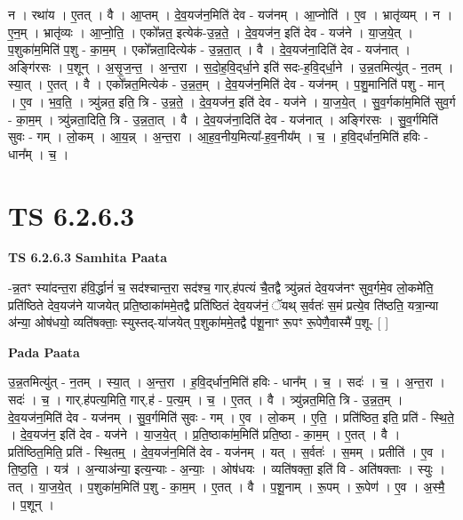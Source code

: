 \documentclass[17pt]{extarticle}
\begin{document}
न । रथा॑य । ए॒तत् । वै । आ॒प्तम् । दे॒व॒यज॑न॒मिति॑ देव - यज॑नम् । आ॒प्नोति॑ । ए॒व । भ्रातृ॑व्यम् । न । ए॒न॒म् । भ्रातृ॑व्यः । आ॒प्नो॒ति॒ । एको᳚न्नत॒ इत्येक॑-उ॒न्न॒ते॒ । दे॒व॒यज॑न॒ इति॑ देव - यज॑ने । या॒ज॒ये॒त् । प॒शुका॑म॒मिति॑ प॒शु - का॒म॒म् । एको᳚न्नता॒दित्येक॑ - उ॒न्न॒ता॒त् । वै । दे॒व॒यज॑ना॒दिति॑ देव - यज॑नात् । अङ्गि॑रसः । प॒शून् । अ॒सृ॒ज॒न्त॒ । अ॒न्त॒रा । स॒दो॒ह॒वि॒द्‌र्धा॒ने इति॑ सदः-ह॒वि॒द्‌र्धा॒ने । उ॒न्न॒तमित्यु॑त् - न॒तम् । स्या॒त् । ए॒तत् । वै । एको᳚न्नत॒मित्येक॑ - उ॒न्न॒त॒म् । दे॒व॒यज॑न॒मिति॑ देव - यज॑नम् । प॒शु॒मानिति॑ पशु - मान् । ए॒व । भ॒व॒ति॒ । त्र्यु॑न्नत॒ इति॒ त्रि - उ॒न्न॒ते॒ । दे॒व॒यज॑न॒ इति॑ देव - यज॑ने । या॒ज॒ये॒त् । सु॒व॒र्गका॑म॒मिति॑ सुव॒र्ग - का॒म॒म् । त्र्यु॑न्नता॒दिति॒ त्रि - उ॒न्न॒ता॒त् । वै । दे॒व॒यज॑ना॒दिति॑ देव - यज॑नात् । अङ्गि॑रसः । सु॒व॒र्गमिति॑ सुवः - गम् । लो॒कम् । आ॒य॒न्न् । अ॒न्त॒रा । आ॒ह॒व॒नीय॒मित्या᳚-ह॒व॒नीय᳚म् । च॒ । ह॒वि॒द्‌र्धान॒मिति॑ हविः - धान᳚म् । च॒ ।  \newline





\section{ TS 6.2.6.3 }

\textbf{TS 6.2.6.3 } \newline
\textbf{Samhita Paata} \newline

-न्न॒तꣳ स्या॑दन्त॒रा ह॑वि॒र्द्धानं॑ च॒ सद॑श्चान्त॒रा सद॑श्च॒ गार्.ह॑पत्यं चै॒तद्वै त्र्यु॑न्नतं देव॒यज॑नꣳ सुव॒र्गमे॒व लो॒कमे॑ति॒ प्रति॑ष्ठिते देव॒यज॑ने याजयेत् प्रति॒ष्ठाका॑ममे॒तद्वै प्रति॑ष्ठितं देव॒यज॑नं॒ ॅयथ् स॒र्वतः॑ स॒मं प्रत्ये॒व ति॑ष्ठति॒ यत्रा॒न्या अ॑न्या॒ ओष॑धयो॒ व्यति॑षक्ताः॒ स्युस्तद्-या॑जयेत् प॒शुका॑ममे॒तद्वै प॑शू॒नाꣳ रू॒पꣳ रू॒पेणै॒वास्मै॑ प॒शू- [  ] \newline

\textbf{Pada Paata} \newline

उ॒न्न॒तमित्यु॑त् - न॒तम् । स्या॒त् । अ॒न्त॒रा । ह॒वि॒द्‌र्धान॒मिति॑ हविः - धान᳚म् । च॒ । सदः॑ । च॒ । अ॒न्त॒रा । सदः॑ । च॒ । गार्.ह॑पत्य॒मिति॒ गार्.ह॑ - प॒त्य॒म् । च॒ । ए॒तत् । वै । त्र्यु॑न्नत॒मिति॒ त्रि - उ॒न्न॒त॒म् । दे॒व॒यज॑न॒मिति॑ देव - यज॑नम् । सु॒व॒र्गमिति॑ सुवः - गम् । ए॒व । लो॒कम् । ए॒ति॒ । प्रति॑ष्ठित॒ इति॒ प्रति॑ - स्थि॒ते॒ । दे॒व॒यज॑न॒ इति॑ देव - यज॑ने । या॒ज॒ये॒त् । प्र॒ति॒ष्ठाका॑म॒मिति॑ प्रति॒ष्ठा - का॒म॒म् । ए॒तत् । वै । प्रति॑ष्ठित॒मिति॒ प्रति॑ - स्थि॒तम्॒ । दे॒व॒यज॑न॒मिति॑ देव - यज॑नम् । यत् । स॒र्वतः॑ । स॒मम् । प्रतीति॑ । ए॒व । ति॒ष्ठ॒ति॒ । यत्र॑ । अ॒न्या‌अ॑न्या॒ इत्य॒न्याः - अ॒न्याः॒ । ओष॑धयः । व्यति॑षक्ता॒ इति॑ वि - अति॑षक्ताः । स्युः । तत् । या॒ज॒ये॒त् । प॒शुका॑म॒मिति॑ प॒शु - का॒म॒म् । ए॒तत् । वै । प॒शू॒नाम् । रू॒पम् । रू॒पेण॑ । ए॒व । अ॒स्मै॒ । प॒शून् ।  \newline
\end{document}
